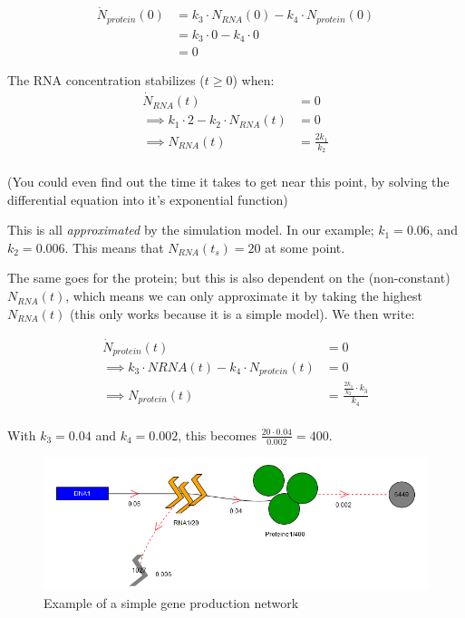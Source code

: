 \documentclass[]{article}
\begin{document}
\begin{equation}
	\begin{aligned}
	\dot{N}_{protein}(0)& = k_3 \cdot N_{RNA}(0) - k_4 \cdot N_{protein}(0)\\
	&= k_3 \cdot 0 - k_4 \cdot 0 \\
	&= 0
	\end{aligned}
\end{equation}

The RNA concentration stabilizes ($t \geq 0$) when:
\begin{equation}
	\begin{aligned}
	\dot{N}_{RNA}(t)& = 0 \\
		\implies
	k_1 \cdot 2 - k_2 \cdot N_{RNA}(t) &= 0\\
		\implies
	N_{RNA}(t) &= \frac{2 k_1}{k_2} \\		
	\end{aligned}
\end{equation}

(You could even find out the time it takes to get near this point, by solving the differential equation into it's exponential function)

This is all \emph{approximated} by the simulation model. In our example; $k_1=0.06$, and $k_2= 0.006$. This means that $N_{RNA}(t_s)=20$ at some point.

The same goes for the protein; but this is also dependent on the (non-constant) $N_{RNA}(t)$, which means we can only approximate it by taking the highest $N_{RNA}(t)$ (this only works because it is a simple model). We then write:

\begin{equation}
	\begin{aligned}
	\dot{N}_{protein}(t)& = 0 \\
		\implies
	k_3 \cdot N{RNA}(t) - k_4 \cdot N_{protein}(t) &= 0\\
		\implies
	N_{protein}(t) &= \frac{\frac{2 k_1}{k_2}\cdot k_3}{k_4} \\		
	\end{aligned}
\end{equation}

With $k_3=0.04$ and $k_4=0.002$, this becomes $\frac{20 \cdot 0.04}{0.002} = 400$.

\begin{figure}
\label{fig:example_1}
\includegraphics[width=\textwidth]{example1}
\caption{Example of a simple gene production network}
\end{figure}
\end{document}
